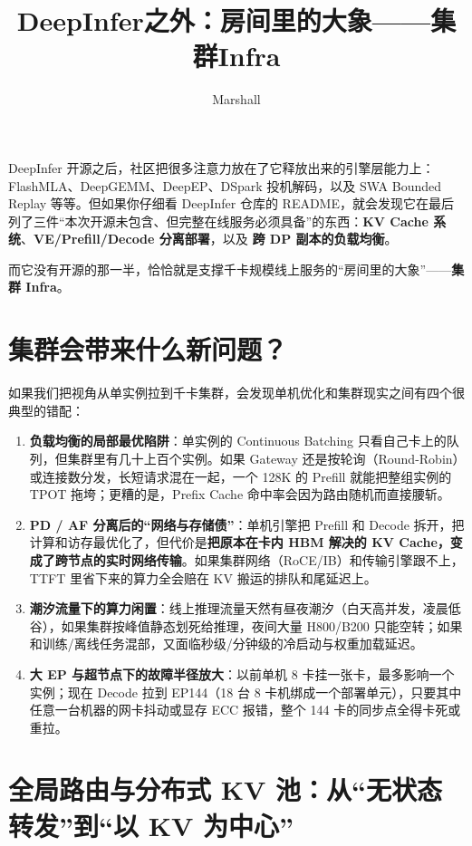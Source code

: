 \documentclass[11pt]{article}
\title{DeepInfer之外：房间里的大象——集群Infra}
\author{Marshall}
\begin{document}
\maketitle

DeepInfer 开源之后，社区把很多注意力放在了它释放出来的引擎层能力上：FlashMLA、DeepGEMM、DeepEP、DSpark 投机解码，以及 SWA Bounded Replay 等等。但如果你仔细看 DeepInfer 仓库的 README，就会发现它在最后列了三件“本次开源未包含、但完整在线服务必须具备”的东西：\textbf{KV Cache 系统}、\textbf{VE/Prefill/Decode 分离部署}，以及 \textbf{跨 DP 副本的负载均衡}。

而它没有开源的那一半，恰恰就是支撑千卡规模线上服务的“房间里的大象”——\textbf{集群 Infra}。

\section{集群会带来什么新问题？}

如果我们把视角从单实例拉到千卡集群，会发现单机优化和集群现实之间有四个很典型的错配：

\begin{enumerate}
  \item \textbf{负载均衡的局部最优陷阱}：单实例的 Continuous Batching 只看自己卡上的队列，但集群里有几十上百个实例。如果 Gateway 还是按轮询（Round-Robin）或连接数分发，长短请求混在一起，一个 128K 的 Prefill 就能把整组实例的 TPOT 拖垮；更糟的是，Prefix Cache 命中率会因为路由随机而直接腰斩。

  \item \textbf{PD / AF 分离后的“网络与存储债”}：单机引擎把 Prefill 和 Decode 拆开，把计算和访存最优化了，但代价是\textbf{把原本在卡内 HBM 解决的 KV Cache，变成了跨节点的实时网络传输}。如果集群网络（RoCE/IB）和传输引擎跟不上，TTFT 里省下来的算力全会赔在 KV 搬运的排队和尾延迟上。

  \item \textbf{潮汐流量下的算力闲置}：线上推理流量天然有昼夜潮汐（白天高并发，凌晨低谷），如果集群按峰值静态划死给推理，夜间大量 H800/B200 只能空转；如果和训练/离线任务混部，又面临秒级/分钟级的冷启动与权重加载延迟。

  \item \textbf{大 EP 与超节点下的故障半径放大}：以前单机 8 卡挂一张卡，最多影响一个实例；现在 Decode 拉到 EP144（18 台 8 卡机绑成一个部署单元），只要其中任意一台机器的网卡抖动或显存 ECC 报错，整个 144 卡的同步点全得卡死或重拉。
\end{enumerate}

\section{全局路由与分布式 KV 池：从“无状态转发”到“以 KV 为中心”}
\end{document}
